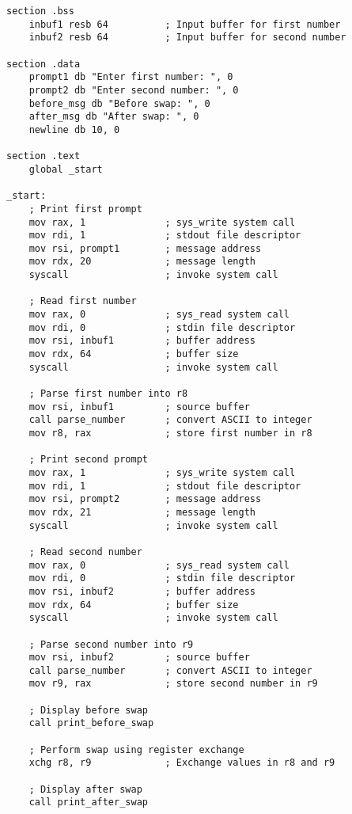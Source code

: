 \documentclass[12pt,a4paper]{article}
\begin{document}
\begin{lstlisting}[caption=64-bit Number Swapping Program]
section .bss
    inbuf1 resb 64          ; Input buffer for first number
    inbuf2 resb 64          ; Input buffer for second number

section .data
    prompt1 db "Enter first number: ", 0
    prompt2 db "Enter second number: ", 0
    before_msg db "Before swap: ", 0
    after_msg db "After swap: ", 0
    newline db 10, 0

section .text
    global _start

_start:
    ; Print first prompt
    mov rax, 1              ; sys_write system call
    mov rdi, 1              ; stdout file descriptor
    mov rsi, prompt1        ; message address
    mov rdx, 20             ; message length
    syscall                 ; invoke system call

    ; Read first number
    mov rax, 0              ; sys_read system call
    mov rdi, 0              ; stdin file descriptor
    mov rsi, inbuf1         ; buffer address
    mov rdx, 64             ; buffer size
    syscall                 ; invoke system call

    ; Parse first number into r8
    mov rsi, inbuf1         ; source buffer
    call parse_number       ; convert ASCII to integer
    mov r8, rax             ; store first number in r8

    ; Print second prompt
    mov rax, 1              ; sys_write system call
    mov rdi, 1              ; stdout file descriptor
    mov rsi, prompt2        ; message address
    mov rdx, 21             ; message length
    syscall                 ; invoke system call

    ; Read second number
    mov rax, 0              ; sys_read system call
    mov rdi, 0              ; stdin file descriptor
    mov rsi, inbuf2         ; buffer address
    mov rdx, 64             ; buffer size
    syscall                 ; invoke system call

    ; Parse second number into r9
    mov rsi, inbuf2         ; source buffer
    call parse_number       ; convert ASCII to integer
    mov r9, rax             ; store second number in r9

    ; Display before swap
    call print_before_swap

    ; Perform swap using register exchange
    xchg r8, r9             ; Exchange values in r8 and r9

    ; Display after swap
    call print_after_swap


\end{lstlisting}
\end{document}
